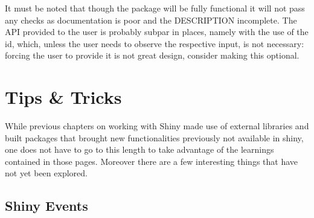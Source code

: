 \documentclass[
]{krantz}
\makeatletter
\newenvironment{Shaded}{\begin{snugshade}}{\end{snugshade}}
\newcommand{\ControlFlowTok}[1]{\textcolor[rgb]{0.27,0.27,0.27}{\textbf{#1}}}
\newcommand{\KeywordTok}[1]{\textcolor[rgb]{0.27,0.27,0.27}{\textbf{#1}}}
\newcommand{\NormalTok}[1]{#1}
\newcommand{\OperatorTok}[1]{\textcolor[rgb]{0.43,0.43,0.43}{\textbf{#1}}}
\newcommand{\StringTok}[1]{\textcolor[rgb]{0.5,0.5,0.5}{#1}}
\newenvironment{kframe}{%
\medskip{}
\setlength{\fboxsep}{.8em}
 \def\at@end@of@kframe{}%
 \ifinner\ifhmode%
  \def\at@end@of@kframe{\end{minipage}}%
  \begin{minipage}{\columnwidth}%
 \fi\fi%
 \def\FrameCommand##1{\hskip\@totalleftmargin \hskip-\fboxsep
 \colorbox{shadecolor}{##1}\hskip-\fboxsep
     \hskip-\linewidth \hskip-\@totalleftmargin \hskip\columnwidth}%
 \MakeFramed {\advance\hsize-\width
   \@totalleftmargin\z@ \linewidth\hsize
   \@setminipage}}%
 {\par\unskip\endMakeFramed%
 \at@end@of@kframe}
\renewenvironment{Shaded}{\begin{kframe}}{\end{kframe}}
\makeatother
\begin{document}
\begin{Shaded}
\end{Shaded}

It must be noted that though the package will be fully functional it will not pass any checks as documentation is poor and the DESCRIPTION incomplete. The API provided to the user is probably subpar in places, namely with the use of the id, which, unless the user needs to observe the respective input, is not necessary: forcing the user to provide it is not great design, consider making this optional.

\hypertarget{tips-tricks}{%
\chapter{Tips \& Tricks}\label{tips-tricks}}

While previous chapters on working with Shiny made use of external libraries and built packages that brought new functionalities previously not available in shiny, one does not have to go to this length to take advantage of the learnings contained in those pages. Moreover there are a few interesting things that have not yet been explored.

\hypertarget{shiny-events}{%
\section*{Shiny Events}\label{shiny-events}}
\end{document}
